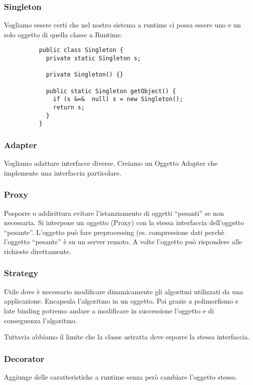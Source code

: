 \documentclass[a5paper]{article}
\begin{document}
      \subsubsection{Singleton}
        Vogliamo essere certi che nel nostro sistema a runtime ci possa essere uno e un solo oggetto di quella classe a Runtime.

        \begin{lstlisting}
          public class Singleton {
            private static Singleton s;

            private Singleton() {}

            public static Singleton getObject() {
              if (s &=&  null) s = new Singleton();
              return s;
            }
          }
        \end{lstlisting}

      \subsubsection{Adapter}
        Vogliamo adattare interfacce diverse. Creiamo un Oggetto Adapter che implemente una interfaccia particolare.

      \subsubsection{Proxy}
        Posporre o addirittura evitare l'istanziamento di oggetti ``pesanti'' se non necessaria. Si interpone un oggetto (Proxy) con la stessa interfaccia dell'oggetto ``pesante''. L'oggetto può fare preprocessing (es. compressione dati perchè l'oggetto ``pesante'' è su un server remoto. A volte l'oggetto può rispondere alle richieste direttamente.

      \subsubsection{Strategy}
        Utile dove è necessario modificare dinamicamente gli algoritmi utilizzati da una applicazione. Encapsula l'algoritmo in un oggetto. Poi grazie a polimorfismo e late binding potremo andare a modificare in successione l'oggetto e di conseguenza l'algoritmo.

        Tuttavia abbiamo il limite che la classe astratta deve esporre la stessa interfaccia.

      \subsubsection{Decorator}
        Aggiunge delle caratteristiche a runtime senza però cambiare l'oggetto stesso.
\end{document}
